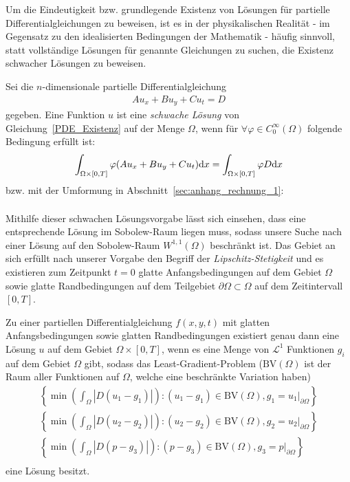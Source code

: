 Um die Eindeutigkeit bzw. grundlegende Existenz von Lösungen für partielle Differentialgleichungen zu beweisen, ist es in der physikalischen Realität - im Gegensatz zu den idealisierten Bedingungen der Mathematik - häufig sinnvoll, statt vollständige Lösungen für genannte Gleichungen zu suchen, die Existenz schwacher Lösungen zu beweisen.
\begin{Definitionbox}[]
    Sei die $n$-dimensionale partielle Differentialgleichung
    \begin{align}
    \label{PDE_Existenz}
        A u_{x} + B u_{y} + C u_{t} = D
    \end{align}
    gegeben. Eine Funktion $u$ ist eine \emph{schwache Lösung} von Gleichung~\eqref{PDE_Existenz} auf der Menge $\Omega$, wenn für $\forall \varphi \in C_0 ^{\infty} (\Omega)$ folgende Bedingung erfüllt ist:
    \begin{align*}
        \int_{\Omega\times [0,T]}{\varphi (A u_{x} + B u_{y} + C u_{t}) \text{d} x} = \int_{\Omega \times [0,T]}{\varphi D \text{d} x}
    \end{align*}
    bzw. mit der Umformung in Abschnitt~\ref{sec:anhang_rechnung_1}: %
    \begin{align*}
    \end{align*}
\end{Definitionbox}
Mithilfe dieser schwachen Lösungsvorgabe lässt sich einsehen, dass eine entsprechende Lösung im Sobolew-Raum liegen muss, sodass unsere Suche nach einer Lösung auf den Sobolew-Raum $W^{1,1}(\Omega)$ beschränkt ist. Das Gebiet an sich erfüllt nach unserer Vorgabe den Begriff der \emph{Lipschitz-Stetigkeit} und es existieren zum Zeitpunkt $t=0$ glatte Anfangsbedingungen auf dem Gebiet $\Omega$ sowie glatte Randbedingungen auf dem Teilgebiet $\partial\Omega \subset \Omega$ auf dem Zeitintervall $[0,T]$.
\begin{Theorembox}[]
    Zu einer partiellen Differentialgleichung $f(x,y,t)$ mit glatten Anfangsbedingungen sowie glatten Randbedingungen existiert genau dann eine Lösung $u$ auf dem Gebiet $\Omega \times [0,T]$, wenn es eine Menge von $\mathcal{L}^1$ Funktionen $g_i$ auf dem Gebiet $\Omega$ gibt, sodass das Least-Gradient-Problem ($\text{BV}(\Omega)$ ist der Raum aller Funktionen auf $\Omega$, welche eine beschränkte Variation haben)
    \begin{align}
        \left\{ \min\left(\int_{\Omega}{|D(u_1 -g_1)|} \right): (u_1 -g_1)\in \text{BV}(\Omega), g_1=\left.u_1 \right\lvert_{\partial\Omega} \right\} \\
        \left\{ \min\left(\int_{\Omega}{|D(u_2 -g_2)|} \right): (u_2 -g_2)\in \text{BV}(\Omega), g_2=\left.u_2 \right\lvert_{\partial\Omega} \right\} \\
        \left\{ \min\left(\int_{\Omega}{|D(p -g_3)|} \right): (p -g_3)\in \text{BV}(\Omega), g_3=\left.p \right\lvert_{\partial\Omega} \right\} \\
    \end{align}
    eine Lösung besitzt.
\end{Theorembox}
